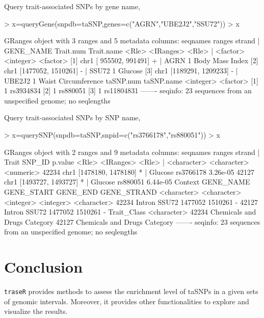 \documentclass{article}
\begin{document}
Query trait-associated SNPs by gene name,
\begin{Schunk}
\begin{Sinput}
> x=queryGene(snpdb=taSNP,genes=c("AGRN","UBE2J2","SSU72"))
> x
\end{Sinput}
\begin{Soutput}
GRanges object with 3 ranges and 5 metadata columns:
      seqnames             ranges strand | GENE_NAME Trait.num          Trait.name
         <Rle>          <IRanges>  <Rle> |  <factor> <integer>            <factor>
  [1]     chr1 [ 955502,  991491]      + |      AGRN         1     Body Mass Index
  [2]     chr1 [1477052, 1510261]      - |     SSU72         1             Glucose
  [3]     chr1 [1189291, 1209233]      - |    UBE2J2         1 Waist Circumference
      taSNP.num taSNP.name
      <integer>   <factor>
  [1]         1  rs3934834
  [2]         1   rs880051
  [3]         1 rs11804831
  -------
  seqinfo: 23 sequences from an unspecified genome; no seqlengths
\end{Soutput}
\end{Schunk}

Query trait-associated SNPs by SNP name,
\begin{Schunk}
\begin{Sinput}
> x=querySNP(snpdb=taSNP,snpid=c("rs3766178","rs880051"))
> x
\end{Sinput}
\begin{Soutput}
GRanges object with 2 ranges and 9 metadata columns:
        seqnames             ranges strand |       Trait      SNP_ID   p.value
           <Rle>          <IRanges>  <Rle> | <character> <character> <numeric>
  42234     chr1 [1478180, 1478180]      * |     Glucose   rs3766178  3.26e-05
  42127     chr1 [1493727, 1493727]      * |     Glucose    rs880051  6.44e-05
            Context   GENE_NAME GENE_START  GENE_END GENE_STRAND
        <character> <character>  <integer> <integer> <character>
  42234      Intron       SSU72    1477052   1510261           -
  42127      Intron       SSU72    1477052   1510261           -
                         Trait_Class
                         <character>
  42234 Chemicals and Drugs Category
  42127 Chemicals and Drugs Category
  -------
  seqinfo: 23 sequences from an unspecified genome; no seqlengths
\end{Soutput}
\end{Schunk}

\section{Conclusion}
{\tt traseR} provides methods to assess the enrichment level of taSNPs
in a given sets of genomic intervals. Moreover, it provides other functionalities to 
explore and visualize the results.
\end{document}
